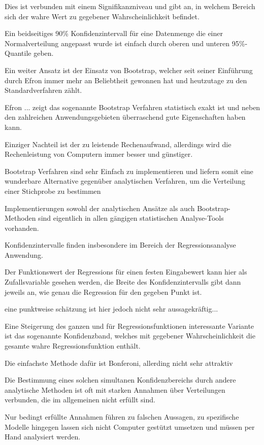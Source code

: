 Dies ist verbunden mit einem Signifikanzniveau und gibt an, in welchem Bereich sich der wahre Wert zu gegebener Wahrscheinlichkeit befindet.

Ein beidseitiges 90\% Konfidenzintervall für eine Datenmenge die einer Normalverteilung angepasst wurde ist einfach durch oberen und unteren 95\%-Quantile geben.

Ein weiter Ansatz ist der Einsatz von Bootstrap, welcher seit seiner Einführung durch Efron immer mehr an Beliebtheit gewonnen hat und heutzutage zu den Standardverfahren zählt.

Efron ... zeigt das sogenannte Bootstrap Verfahren statistisch exakt ist und neben den zahlreichen Anwendungsgebieten überraschend gute Eigenschaften haben kann.

Einziger Nachteil ist der zu leistende Rechenaufwand, allerdings wird die Rechenleistung von Computern immer besser und günstiger.

Bootstrap Verfahren sind sehr Einfach zu implementieren und liefern somit eine wunderbare Alternative gegenüber analytischen Verfahren, um die Verteilung einer Stichprobe zu bestimmen

Implementierungen sowohl der analytischen Ansätze als auch Bootstrap-Methoden sind eigentlich in allen gängigen statistischen Analyse-Tools vorhanden. 

Konfidenzintervalle finden insbesondere im Bereich der Regressionsanalyse Anwendung.

Der Funktionswert der Regressions für einen festen Eingabewert kann hier als Zufallsvariable gesehen werden, die Breite des Konfidenzintervalls gibt dann jeweils an, wie genau die Regression für den gegeben Punkt ist.

eine punktweise schätzung ist hier jedoch nicht sehr aussagekräftig...

Eine Steigerung des ganzen und für Regressionsfunktionen interessante Variante ist das sogenannte Konfidenzband, welches mit gegebener Wahrscheinlichkeit die gesamte wahre Regressionsfunktion enthält.

Die einfachste Methode dafür ist Bonferoni, allerding nicht sehr attraktiv

Die Bestimmung eines solchen simultanen Konfidenzbereichs durch andere analytische Methoden ist oft mit starken Annahmen über Verteilungen verbunden, die im allgemeinen nicht erfüllt sind.

Nur bedingt erfüllte Annahmen führen zu falschen Aussagen, zu spezifische Modelle hingegen lassen sich nicht Computer gestützt umsetzen und müssen per Hand analysiert werden.

